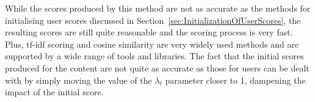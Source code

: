 While the scores produced by this method are not as accurate as the methods for initialising user scores discussed in Section~\ref{sec:InitializationOfUserScores}, the resulting scores are still quite reasonable and the scoring process is very fast. Plus, tf-idf scoring and cosine similarity are very widely used methods and are supported by a wide range of tools and libraries. The fact that the initial scores produced for the content are not quite as accurate as those for users can be dealt with by simply moving the value of the $\lambda_{t}$ parameter closer to 1, dampening the impact of the initial score.
